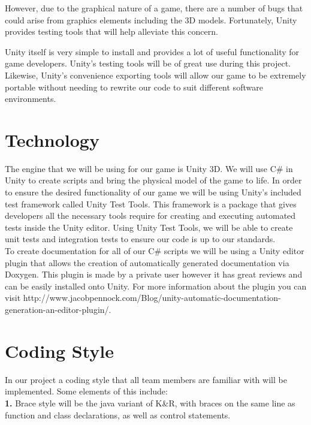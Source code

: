 \documentclass{article}
\begin{document}
However, due to the graphical nature of a game, there are a number of bugs that could arise from graphics elements including the 3D models. Fortunately, Unity provides testing tools that will help alleviate this concern. 

Unity itself is very simple to install and provides a lot of useful functionality for game developers. Unity's testing tools will be of great use during this project. Likewise, Unity's convenience exporting tools will allow our game to be extremely portable without needing to rewrite our code to suit different software environments. 


\section{Technology}

The engine that we will be using for our game is Unity 3D. We will use C\# in Unity to create scripts and bring the physical model of the game to life. In order to ensure the desired functionality of our game we will be using Unity’s included test framework called Unity Test Tools. This framework is a package that gives developers all the necessary tools require for creating and executing automated tests inside the Unity editor. Using Unity Test Tools, we will be able to create unit tests and integration tests to ensure our code is up to our standards. \\

To create documentation for all of our C\# scripts we will be using a Unity editor plugin that allows the creation of automatically generated documentation via Doxygen. This plugin is made by a private user however it has great reviews and can be easily installed onto Unity. For more information about the plugin you can visit http://www.jacobpennock.com/Blog/unity-automatic-documentation-generation-an-editor-plugin/.


\section{Coding Style}


In our project a coding style that all team members are familiar with will be implemented. Some elements of this include: \\

\textbf{1.} Brace style will be the java variant of K\&R, with braces on the same line as function and class declarations, as well as control statements. \\
\end{document}

